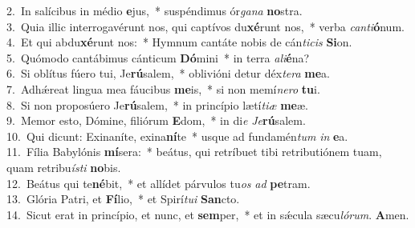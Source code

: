 {2.~}In salícibus in médio \textbf{e}jus,~* suspéndimus ór\textit{ga}\textit{na} \textbf{no}stra.\\
{3.~}Quia illic interrogavérunt nos, qui captívos du\textbf{xé}runt nos,~* verba \textit{can}\textit{ti}\textbf{ó}num.\\
{4.~}Et qui abdu\textbf{xé}runt nos:~* Hymnum cantáte nobis de cán\textit{ti}\textit{cis} \textbf{Si}on.\\
{5.~}Quómodo cantábimus cánticum \textbf{Dó}mini~* in terra \textit{a}\textit{li}\textbf{é}na?\\
{6.~}Si oblítus fúero tui, Je\textbf{rú}salem,~* oblivióni detur déx\textit{te}\textit{ra} \textbf{me}a.\\
{7.~}Adhǽreat lingua mea fáucibus \textbf{me}is,~* si non memí\textit{ne}\textit{ro} \textbf{tu}i.\\
{8.~}Si non proposúero Je\textbf{rú}salem,~* in princípio lætí\textit{ti}\textit{æ} \textbf{me}æ.\\
{9.~}Memor esto, Dómine, filiórum \textbf{E}dom,~* in di\textit{e} \textit{Je}\textbf{rú}salem.\\
{10.~}Qui dicunt: Exinaníte, exina\textbf{ní}te~* usque ad fundamén\textit{tum} \textit{in} \textbf{e}a.\\
{11.~}Fília Babylónis \textbf{mí}sera:~* beátus, qui retríbuet tibi retributiónem tuam, quam retribu\textit{í}\textit{sti} \textbf{no}bis.\\
{12.~}Beátus qui te\textbf{né}bit,~* et allídet párvulos tu\textit{os} \textit{ad} \textbf{pe}tram.\\
{13.~}Glória Patri, et \textbf{Fí}lio,~* et Spirí\textit{tu}\textit{i} \textbf{San}cto.\\
{14.~}Sicut erat in princípio, et nunc, et \textbf{sem}per,~* et in sǽcula sæcu\textit{ló}\textit{rum}. \textbf{A}men.\\

